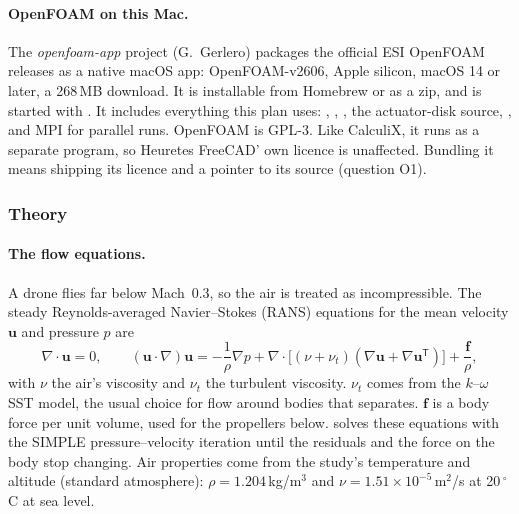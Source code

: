 \paragraph{OpenFOAM on this Mac.} The \emph{openfoam-app} project (G.~Gerlero) packages the official ESI
OpenFOAM releases as a native macOS app: OpenFOAM-v2606, Apple silicon, macOS 14 or later, a 268\,MB
download. It is installable from Homebrew or as a zip, and is started with
. It includes everything this plan uses:
, , , the actuator-disk source, , and MPI
for parallel runs. OpenFOAM is GPL-3. Like CalculiX, it runs as a separate program, so Heuretes FreeCAD' own
licence is unaffected. Bundling it means shipping its licence and a pointer to its source (question O1).

\subsubsection*{Theory}

\paragraph{The flow equations.} A drone flies far below Mach~0.3, so the air is treated as incompressible.
The steady Reynolds-averaged Navier--Stokes (RANS) equations for the mean velocity $\mathbf u$ and pressure $p$
are
\[
  \nabla\cdot\mathbf u=0,\qquad
  (\mathbf u\cdot\nabla)\mathbf u=-\frac{1}{\rho}\nabla p
   +\nabla\cdot\bigl[(\nu+\nu_t)(\nabla\mathbf u+\nabla\mathbf u^{\mathsf T})\bigr]+\frac{\mathbf f}{\rho},
\]
with $\nu$ the air's viscosity and $\nu_t$ the turbulent viscosity. $\nu_t$ comes from the $k$--$\omega$ SST
model, the usual choice for flow around bodies that separates. $\mathbf f$ is a body force per unit volume,
used for the propellers below.  solves these equations with the SIMPLE pressure--velocity
iteration until the residuals and the force on the body stop changing. Air properties come from the study's
temperature and altitude (standard atmosphere): $\rho=1.204$\,kg/m$^3$ and $\nu=1.51\times10^{-5}$\,m$^2$/s
at 20\,$^\circ$C at sea level.


